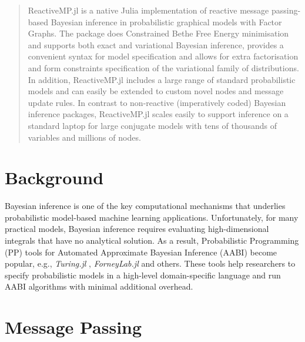 \documentclass{juliacon}
\begin{document}


\maketitle

\begin{abstract}

ReactiveMP.jl is a native Julia implementation of reactive message passing-based Bayesian inference in probabilistic graphical models with Factor Graphs. 
The package does Constrained Bethe Free Energy minimisation and supports both exact and variational Bayesian inference, provides a convenient syntax for model specification and allows for extra factorisation and form constraints specification of the
variational family of distributions. In addition, ReactiveMP.jl includes a large range of standard probabilistic models and can easily be extended to custom novel nodes and message update rules. 
In contrast to non-reactive (imperatively coded) Bayesian inference packages, ReactiveMP.jl scales easily to support inference on a standard laptop 
for large conjugate models with tens of thousands of variables and millions of nodes. 

\end{abstract}

\section{Background}

Bayesian inference is one of the key computational mechanisms that underlies probabilistic model-based machine learning applications. 
Unfortunately, for many practical models, Bayesian inference requires evaluating high-dimensional integrals that have no analytical solution. 
As a result, Probabilistic Programming (PP) tools for Automated Approximate Bayesian Inference (AABI) become popular, e.g., \textit{Turing.jl} \cite{ge2018t}, 
\textit{ForneyLab.jl} \cite{ForneyLab.jl-2019} and others. These tools help researchers to specify probabilistic models in a high-level domain-specific language and 
run AABI algorithms with minimal additional overhead. 

\section{Message Passing}
\end{document}

